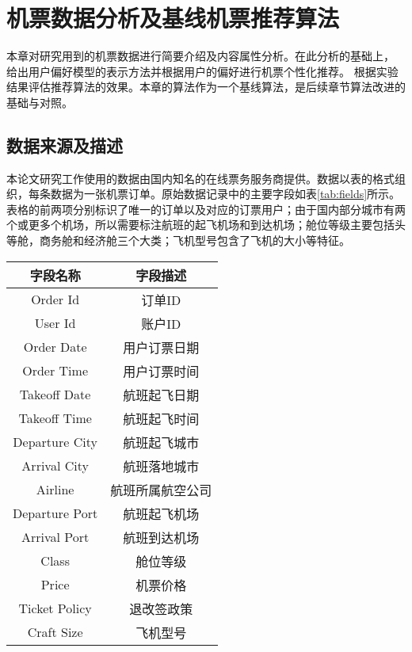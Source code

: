 
\chapter{机票数据分析及基线机票推荐算法}
\label{chap:baseline}
本章对研究用到的机票数据进行简要介绍及内容属性分析。在此分析的基础上，
给出用户偏好模型的表示方法并根据用户的偏好进行机票个性化推荐。
根据实验结果评估推荐算法的效果。本章的算法作为一个基线算法，是后续章节算法改进的基础与对照。

\section{数据来源及描述}
本论文研究工作使用的数据由国内知名的在线票务服务商提供。数据以表的格式组织，每条数据为一张机票订单。原始数据记录中的主要字段如表\ref{tab:fields}所示。
表格的前两项分别标识了唯一的订单以及对应的订票用户；由于国内部分城市有两个或更多个机场，所以需要标注航班的起飞机场和到达机场；舱位等级主要包括头等舱，商务舱和经济舱三个大类；飞机型号包含了飞机的大小等特征。

\begin{table}[!hpb]
  \centering
  \begin{tabular}{|c|c|} \hline 
    字段名称 & 字段描述\\ \hline
    Order Id & 订单ID \\ \hline
    User Id &  账户ID \\ \hline
    Order Date & 用户订票日期 \\ \hline
    Order Time & 用户订票时间 \\ \hline
    Takeoff Date & 航班起飞日期 \\ \hline
    Takeoff Time & 航班起飞时间 \\ \hline
    Departure City & 航班起飞城市 \\ \hline
    Arrival City & 航班落地城市 \\ \hline
    Airline & 航班所属航空公司 \\ \hline
    Departure Port & 航班起飞机场 \\ \hline
    Arrival Port & 航班到达机场 \\ \hline
    Class & 舱位等级 \\ \hline
    Price & 机票价格 \\ \hline
    Ticket Policy & 退改签政策 \\ \hline
    Craft Size & 飞机型号 \\ \hline
  \end{tabular}
\end{table}

